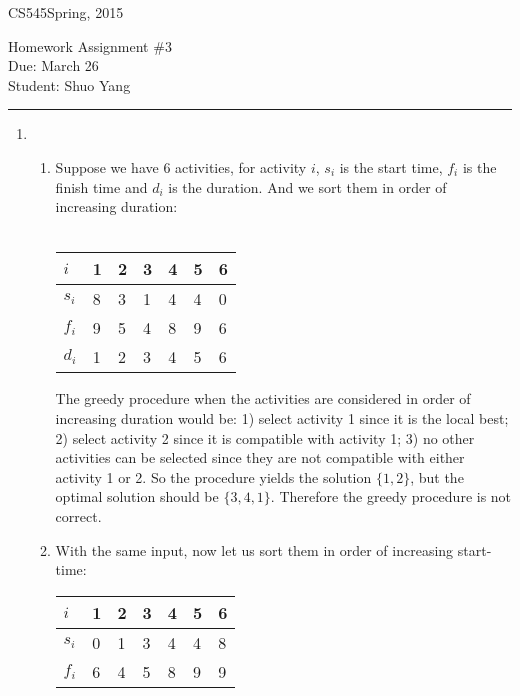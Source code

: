 \documentclass[11pt]{article}
\def\CourseCode{CS545}
\def\AssignmentNo{3}
\def\DateHandedOut{Spring, 2015}
\def\DateDue{March 26}
\def\Author{Shuo Yang}
\begin{document}
\noindent

\CourseCode \hfill \DateHandedOut

\begin{center}
Homework Assignment \#\AssignmentNo\\
Due: \DateDue\\
Student: \Author\\
\end{center}

\hrule\smallskip

\begin{enumerate}

\item %
\begin{enumerate} %
\item Suppose we have 6 activities, for activity $i$, $s_i$ is the
  start time, $f_i$ is the finish time and $d_i$ is the duration. 
And we sort them in order of increasing duration:\\\\
\begin{tabular}{ l | l l l l l l }
  $i$ & 1 & 2 & 3 & 4 & 5 & 6\\ \hline
  $s_i$ & 8 & 3 & 1 & 4 & 4 & 0\\
  $f_i$ & 9 & 5 & 4 & 8 & 9 & 6\\
  $d_i$ & 1 & 2 & 3 & 4 & 5 & 6\\
\end{tabular}

The greedy procedure when the activities are considered in order of
increasing duration would be: 1) select activity 1 since it is the
local best; 2) select activity 2 since it is compatible with activity
1; 3) no other activities can be selected since they are not
compatible with either activity 1 or 2. So the procedure yields the
solution $\{1,2\}$, but the optimal solution should be
$\{3,4,1\}$. Therefore the greedy procedure is not correct.

\item With the same input, now let us sort them in order of increasing
  start-time:\\

\begin{tabular}{ l | l l l l l l }
  $i$ & 1 & 2 & 3 & 4 & 5 & 6\\ \hline
  $s_i$ & 0 & 1 & 3 & 4 & 4 & 8\\
  $f_i$ & 6 & 4 & 5 & 8 & 9 & 9\\
\end{tabular}


\end{enumerate}
\end{enumerate}
\end{document}
